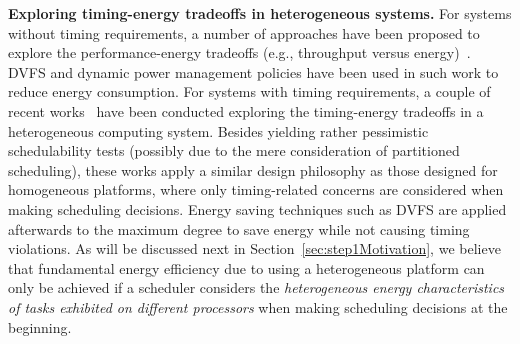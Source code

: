 \vspace{1mm} \noindent \textbf{Exploring timing-energy tradeoffs in heterogeneous systems.} For systems without timing requirements, a number of approaches have been proposed to explore the performance-energy tradeoffs (e.g., throughput versus energy)~\cite{muthukaruppan2014price, chen2014adaptive, muck2015run, sarma2015smartbalance, lin2014energy, tan2015approximation, elewi2014energy, annamalai2014reducing, yavits2014effect, beaumont2014analysis, gutierrez2014evaluating}. DVFS and dynamic power management policies have been used in such work to reduce energy consumption. %
 For systems with timing requirements, a couple of recent works~\cite{liuenergy, colin2014energy} have been conducted exploring the timing-energy tradeoffs in a heterogeneous computing system.  Besides yielding rather pessimistic schedulability tests (possibly due to the mere consideration of partitioned scheduling), these works apply a similar design philosophy as those designed for homogeneous platforms, where only timing-related concerns are considered when making scheduling decisions. Energy saving techniques such as DVFS are applied afterwards to the maximum degree to save energy while not causing timing violations. As will be discussed next in Section~\ref{sec:step1Motivation}, we believe that fundamental energy efficiency due to using a heterogeneous platform can only be achieved if  a scheduler considers the \textit{heterogeneous energy characteristics of tasks exhibited on different processors} when making scheduling decisions at the beginning.

